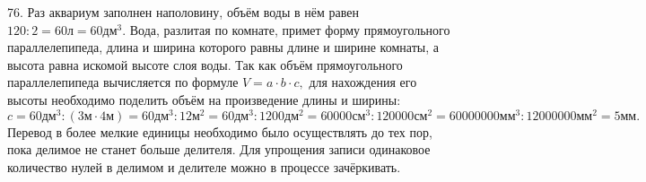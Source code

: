 76. Раз аквариум заполнен наполовину, объём воды в нём равен $120:2=60\text{л}=60\text{дм}^3.$ Вода, разлитая по комнате, примет форму прямоугольного параллелепипеда, длина и ширина которого равны длине и ширине комнаты, а высота равна искомой высоте слоя воды. Так как объём прямоугольного параллелепипеда вычисляется по формуле $V=a\cdot b\cdot c,$ для нахождения его высоты необходимо поделить объём на произведение длины и ширины: $c=60\text{дм}^3:(3\text{м}\cdot4\text{м})=60\text{дм}^3:12\text{м}^2=60\text{дм}^3:1200\text{дм}^2=60000\text{см}^3:120000\text{см}^2=60000000\text{мм}^3:12000000\text{мм}^2=
5\text{мм}.$ Перевод в более мелкие единицы необходимо было осуществлять до тех пор, пока делимое не станет больше делителя. Для упрощения записи одинаковое количество нулей в делимом и делителе можно в процессе зачёркивать.\\
